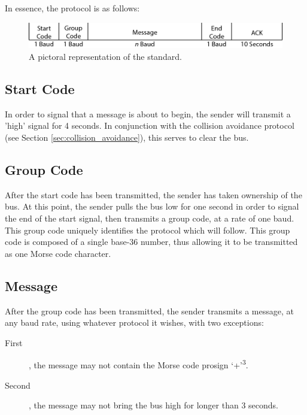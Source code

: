 In essence, the protocol is as follows:

\begin{figure}[!ht]
\centering
\includegraphics[width=\textwidth]{datalink_diagram.png}
\caption{A pictoral representation of the standard.}
\label{fig:standard}
\end{figure}

\subsection{Start Code}

In order to signal that a message is about to begin, the sender will transmit a 'high' signal for 4 seconds. In conjunction with the collision avoidance protocol (see Section \ref{sec:collision_avoidance}), this serves to clear the bus.

\subsection{Group Code}

After the start code has been transmitted, the sender has taken ownership of the bus. At this point, the sender pulls the bus low for one second in order to signal the end of the start signal, then transmits a group code, at a rate of one baud. This group code uniquely identifies the protocol which will follow. This group code is composed of a single base-36 number, thus allowing it to be transmitted as one Morse code character.

\subsection{Message}

After the group code has been transmitted, the sender transmits a message, at any baud rate, using whatever protocol it wishes, with two exceptions:
\begin{description}
\item[First]\hspace{-6pt}, the message may not contain the Morse code prosign `+'\textsuperscript{3}.
\item[Second]\hspace{-6pt}, the message may not bring the bus high for longer than 3 seconds.
\end{description}

